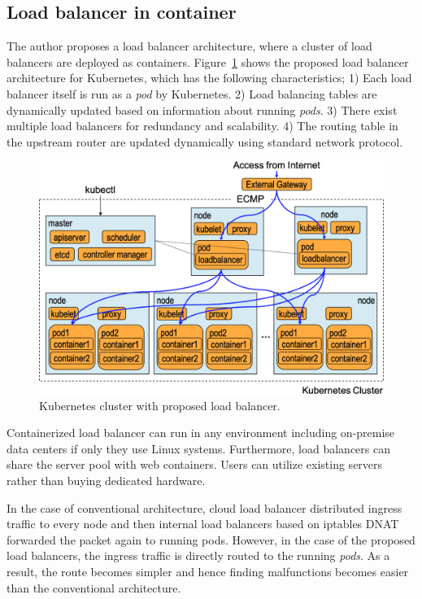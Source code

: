 \FloatBarrier

\subsection{Load balancer in container}

The author proposes a load balancer architecture, where a cluster of load balancers are deployed as containers.
Figure~\ref{fig:K8sProposed} shows the proposed load balancer architecture for Kubernetes,
which has the following characteristics;
1) Each load balancer itself is run as a {\em pod} by Kubernetes. 
2) Load balancing tables are dynamically updated based on information about running {\em pods}.
3) There exist multiple load balancers for redundancy and scalability.
4) The routing table in the upstream router are updated dynamically using standard network protocol.

\begin{figure}[h]
  \centering
  \includegraphics[width=0.8\columnwidth]{Figs/K8sProposed}
  \caption{Kubernetes cluster with proposed load balancer.}
  \label{fig:K8sProposed}
\end{figure}

Containerized load balancer can run in any environment including on-premise data centers if only they use Linux systems.
Furthermore, load balancers can share the server pool with web containers.
Users can utilize existing servers rather than buying dedicated hardware.

In the case of conventional architecture, cloud load balancer distributed ingress traffic to every node and then internal load balancers based on iptables DNAT forwarded the packet again to running pods.
However, in the case of the proposed load balancers, the ingress traffic is directly routed to the running {\em pods}.
As a result, the route becomes simpler and hence finding malfunctions becomes easier than the conventional architecture.

